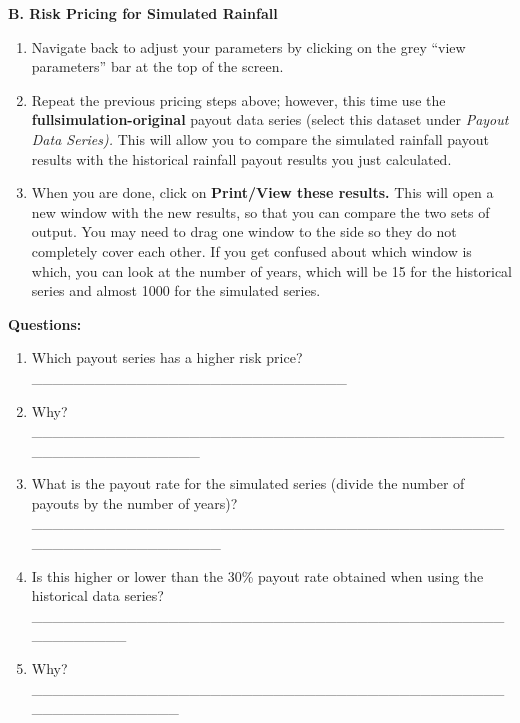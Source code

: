 \documentclass[letterpaper,10pt,english]{sphinxmanual}
\begin{document}
\textbf{B. Risk Pricing for Simulated Rainfall}
\begin{enumerate}
\item {} 
Navigate back to adjust your parameters by clicking on the grey ``view parameters'' bar at the top of the screen.

\item {} 
Repeat the previous pricing steps above; however, this time use the \textbf{fullsimulation-original} payout data series (select this dataset under \emph{Payout Data Series).} This will allow you to compare the simulated rainfall payout results with the historical rainfall payout results you just calculated.

\item {} 
When you are done, click on \textbf{Print/View these results.} This will open a new window with the new results, so that you can compare the two sets of output. You may need to drag one window to the side so they do not completely cover each other. If you get confused about which window is which, you can look at the number of years, which will be 15 for the historical series and almost 1000 for the simulated series.

\end{enumerate}

\textbf{Questions:}
\begin{enumerate}
\item {} 
Which payout series has a higher risk price? \_\_\_\_\_\_\_\_\_\_\_\_\_\_\_\_\_\_\_\_\_\_\_\_\_\_\_\_\_\_

\item {} 
Why? \_\_\_\_\_\_\_\_\_\_\_\_\_\_\_\_\_\_\_\_\_\_\_\_\_\_\_\_\_\_\_\_\_\_\_\_\_\_\_\_\_\_\_\_\_\_\_\_\_\_\_\_\_\_\_\_\_\_\_\_\_

\item {} 
What is the payout rate for the simulated series (divide the number of payouts by the number of years)? \_\_\_\_\_\_\_\_\_\_\_\_\_\_\_\_\_\_\_\_\_\_\_\_\_\_\_\_\_\_\_\_\_\_\_\_\_\_\_\_\_\_\_\_\_\_\_\_\_\_\_\_\_\_\_\_\_\_\_\_\_\_\_

\item {} 
Is this higher or lower than the 30\% payout rate obtained when using the historical data series? \_\_\_\_\_\_\_\_\_\_\_\_\_\_\_\_\_\_\_\_\_\_\_\_\_\_\_\_\_\_\_\_\_\_\_\_\_\_\_\_\_\_\_\_\_\_\_\_\_\_\_\_\_\_

\item {} 
Why? \_\_\_\_\_\_\_\_\_\_\_\_\_\_\_\_\_\_\_\_\_\_\_\_\_\_\_\_\_\_\_\_\_\_\_\_\_\_\_\_\_\_\_\_\_\_\_\_\_\_\_\_\_\_\_\_\_\_\_

\end{enumerate}
\end{document}
